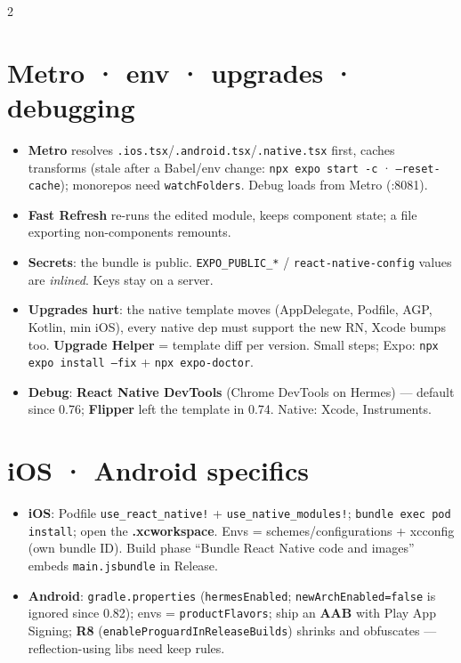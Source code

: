 \documentclass[8pt]{extarticle}
\begin{document}
\begin{multicols}{2}
\section{Metro · env · upgrades · debugging}
\begin{itemize}
  \item \textbf{Metro} resolves \texttt{.ios.tsx}/\texttt{.android.tsx}/\texttt{.native.tsx}
        first, caches transforms (stale after a Babel/env change: \texttt{npx expo start -c}
        · \texttt{--reset-cache}); monorepos need \texttt{watchFolders}. Debug loads from
        Metro (:8081).
  \item \textbf{Fast Refresh} re-runs the edited module, keeps component state; a file
        exporting non-components remounts.
  \item \textbf{Secrets}: the bundle is public. \texttt{EXPO\_PUBLIC\_*} /
        \texttt{react-native-config} values are \emph{inlined}. Keys stay on a server.
  \item \textbf{Upgrades hurt}: the native template moves (AppDelegate, Podfile, AGP,
        Kotlin, min iOS), every native dep must support the new RN, Xcode bumps too.
        \textbf{Upgrade Helper} = template diff per version. Small steps; Expo:
        \texttt{npx expo install --fix} + \texttt{npx expo-doctor}.
  \item \textbf{Debug}: \textbf{React Native DevTools} (Chrome DevTools on Hermes) —
        default since 0.76; \textbf{Flipper} left the template in 0.74. Native: Xcode,
        Instruments.
\end{itemize}

\section{iOS · Android specifics}
\begin{itemize}
  \item \textbf{iOS}: Podfile \texttt{use\_react\_native!} + \texttt{use\_native\_modules!};
        \texttt{bundle exec pod install}; open the \textbf{.xcworkspace}. Envs =
        schemes/configurations + xcconfig (own bundle ID). Build phase ``Bundle React
        Native code and images'' embeds \texttt{main.jsbundle} in Release.
  \item \textbf{Android}: \texttt{gradle.properties} (\texttt{hermesEnabled};
        \texttt{newArchEnabled=false} is ignored since 0.82); envs = \texttt{productFlavors}; ship an \textbf{AAB} with
        Play App Signing; \textbf{R8} (\texttt{enableProguardInReleaseBuilds}) shrinks and
        obfuscates — reflection-using libs need keep rules.
\end{itemize}


\end{multicols}
\end{document}
